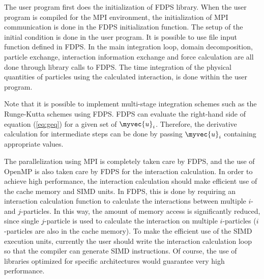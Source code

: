 
The user program first does the initialization of FDPS library. When
the user program is compiled for the MPI environment, the
initialization of MPI communication is done in the FDPS initialization
function.  The setup of the initial condition is done in the user
program.  It is possible to use file input function defined in FDPS.
In the main integration loop, domain decomposition, particle exchange,
interaction information exchange and force calculation are all done
through library calls to FDPS.  The time integration of the physical
quantities of particles using the calculated interaction, is done
within the user program.


  

Note that it is possible to implement multi-stage integration schemes
such as the Runge-Kutta schemes using FDPS. FDPS can evaluate the
right-hand side of equation (\ref{eq:geq}) for a given set of
$\myvec{u}_i$. Therefore, the derivative calculation for intermediate
steps can be done by passing $\myvec{u}_i$ containing appropriate
values.

The parallelization using MPI is completely taken care by FDPS, and
the use of OpenMP is also taken care by FDPS for the interaction
calculation. In order to achieve high performance, the interaction
calculation should make efficient use of the cache memory and SIMD
units. In FDPS, this is done by requiring an interaction calculation
function to calculate the interactions between multiple $i$- and
$j$-particles. In this way, the amount of memory access is
significantly reduced, since single $j$-particle is used to calculate
the interaction on multiple $i$-particles ($i$-particles are also in
the cache memory). To make the efficient use of the SIMD execution
units, currently the user should write the interaction calculation
loop so that the compiler can generate SIMD instructions. Of course,
the use of libraries optimized for specific architectures
\citep{2006NewA...12..169N, 2012NewA...17...82T, 2013NewA...19...74T}
would guarantee very high performance.

